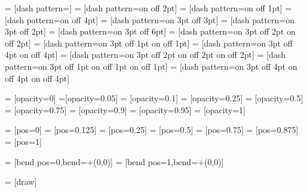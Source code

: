 =                   [dash pattern=]
=                  [dash pattern=on \pgflinewidth off 2pt]
=          [dash pattern=on \pgflinewidth off 1pt]
=          [dash pattern=on \pgflinewidth off 4pt]
=                  [dash pattern=on 3pt off 3pt]
=          [dash pattern=on 3pt off 2pt]
=          [dash pattern=on 3pt off 6pt]
=              [dash pattern=on 3pt off 2pt on \the\pgflinewidth off 2pt]
=      [dash pattern=on 3pt off 1pt on \the\pgflinewidth off 1pt]
=      [dash pattern=on 3pt off 4pt on \the\pgflinewidth off 4pt]
=           [dash pattern=on 3pt off 2pt on \the\pgflinewidth off 2pt on \the\pgflinewidth off 2pt]
=   [dash pattern=on 3pt off 1pt on \the\pgflinewidth off 1pt on \the\pgflinewidth off 1pt]
=   [dash pattern=on 3pt off 4pt on \the\pgflinewidth off 4pt on \the\pgflinewidth off 4pt]


=             [opacity=0]
=[opacity=0.05]
= [opacity=0.1]
=      [opacity=0.25]
=         [opacity=0.5]
=           [opacity=0.75]
=      [opacity=0.9]
=     [opacity=0.95]
=                  [opacity=1]

=                [pos=0]
=         [pos=0.125]
=              [pos=0.25]
=                  [pos=0.5]
=                [pos=0.75]
=           [pos=0.875]
=                  [pos=1]

=           [bend pos=0,bend={+(0,0)}]
=             [bend pos=1,bend={+(0,0)}]

=        [draw]



%
%


